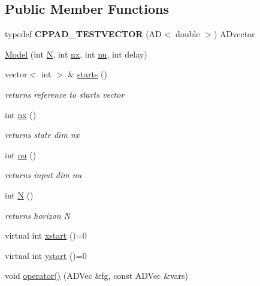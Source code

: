 \subsection*{Public Member Functions}
\begin{DoxyCompactItemize}
\item 
\mbox{\label{classModel_a5a1534764960064921f2823621a1dddb}} 
typedef {\bfseries C\+P\+P\+A\+D\+\_\+\+T\+E\+S\+T\+V\+E\+C\+T\+OR} (AD$<$ double $>$) A\+Dvector
\item 
\mbox{\hyperlink{classModel_ae594ebc83ab169fcccda2c9e238c0d90}{Model}} (int \mbox{\hyperlink{classModel_aca776f8a10906afa8a5c362034727921}{N}}, int \mbox{\hyperlink{classModel_a951f42de158e872b5affece79521b968}{nx}}, int \mbox{\hyperlink{classModel_a0afbb992dab28ae89f1b0b114d65689c}{nu}}, int delay)
\item 
\mbox{\label{classModel_a206c5adc8789eed1598f61be030247af}} 
vector$<$ int $>$ \& \mbox{\hyperlink{classModel_a206c5adc8789eed1598f61be030247af}{starts}} ()
\begin{DoxyCompactList}\small\item\em returns reference to starts vector \end{DoxyCompactList}\item 
\mbox{\label{classModel_a951f42de158e872b5affece79521b968}} 
int \mbox{\hyperlink{classModel_a951f42de158e872b5affece79521b968}{nx}} ()
\begin{DoxyCompactList}\small\item\em returns state dim nx \end{DoxyCompactList}\item 
\mbox{\label{classModel_a0afbb992dab28ae89f1b0b114d65689c}} 
int \mbox{\hyperlink{classModel_a0afbb992dab28ae89f1b0b114d65689c}{nu}} ()
\begin{DoxyCompactList}\small\item\em returns input dim nu \end{DoxyCompactList}\item 
\mbox{\label{classModel_aca776f8a10906afa8a5c362034727921}} 
int \mbox{\hyperlink{classModel_aca776f8a10906afa8a5c362034727921}{N}} ()
\begin{DoxyCompactList}\small\item\em returns horizon N \end{DoxyCompactList}\item 
virtual int \mbox{\hyperlink{classModel_ab98f8c18036d9bada533325300865c5e}{xstart}} ()=0
\item 
virtual int \mbox{\hyperlink{classModel_ae505a277c05e465d0a41fa75d4116350}{ystart}} ()=0
\item 
void \mbox{\hyperlink{classModel_a138487dfb01ab6af0856c493f20ad179}{operator()}} (A\+D\+Vec \&fg, const A\+D\+Vec \&vars)
\end{DoxyCompactItemize}
